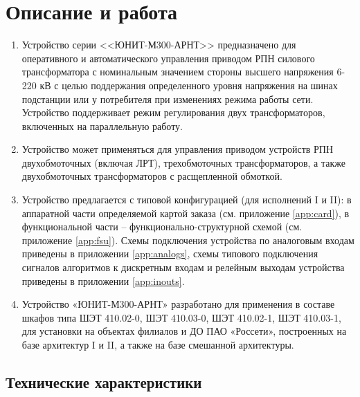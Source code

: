 \color{uniblue}\section[Описание и работа]{Описание и работа}
\color{black}

\color{black}

\begin{enumerate}

\item
Устройство серии <<ЮНИТ-М300-АРНТ>> предназначено для оперативного и автоматического управления приводом РПН силового трансформатора с номинальным значением стороны высшего напряжения 6-220 кВ с целью поддержания определенного уровня напряжения на шинах подстанции или у потребителя при изменениях режима работы сети. Устройство поддерживает режим регулирования двух трансформаторов, включенных на параллельную работу.
\item
Устройство может применяться для управления приводом устройств РПН двухобмоточных (включая ЛРТ), трехобмоточных трансформаторов, а также двухобмоточных трансформаторов с расщепленной обмоткой.
\item 
Устройство предлагается с типовой конфигурацией (для исполнений I и II): в аппаратной части определяемой картой заказа (см. приложение \ref{app:card}), в функциональной части -- функционально-структурной схемой (см. приложение \ref{app:fsu}). Схемы подключения устройства по аналоговым входам приведены в приложении \ref{app:analogs}, схемы типового подключения сигналов алгоритмов к дискретным входам и релейным выходам устройства приведены в приложении \ref{app:inouts}.
\item
Устройство «ЮНИТ-М300-АРНТ» разработано для применения в составе шкафов типа ШЭТ 410.02-0, ШЭТ 410.03-0, ШЭТ 410.02-1, ШЭТ 410.03-1, для установки на объектах филиалов  и  ДО  ПАО  «Россети», построенных на базе архитектур I и II, а также на базе смешанной архитектуры.

\end{enumerate}


\color{uniblue}\subsection{Технические характеристики}
\color{black}

